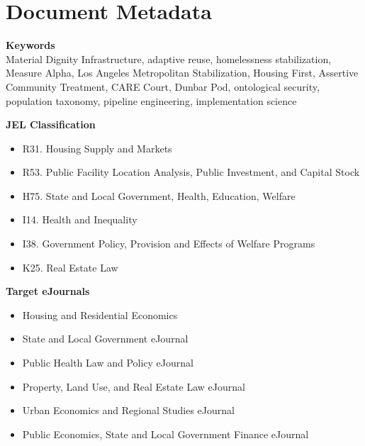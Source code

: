 \documentclass[12pt, letterpaper]{article}
\begin{document}

\newpage
\section*{Document Metadata}

{\footnotesize{}

\noindent\textbf{Keywords}\\[1pt]
Material Dignity Infrastructure, adaptive reuse, homelessness stabilization, Measure Alpha, Los Angeles Metropolitan Stabilization, Housing First, Assertive Community Treatment, CARE Court, Dunbar Pod, ontological security, population taxonomy, pipeline engineering, implementation science

\vspace{8pt}
\noindent\textbf{JEL Classification}
\begin{itemize}[nosep, before={\vspace{-8pt}}, leftmargin=2em]
    \item R31. Housing Supply and Markets
    \item R53. Public Facility Location Analysis, Public Investment, and Capital Stock
    \item H75. State and Local Government, Health, Education, Welfare
    \item I14. Health and Inequality
    \item I38. Government Policy, Provision and Effects of Welfare Programs
    \item K25. Real Estate Law
\end{itemize}

\vspace{8pt}
\noindent\textbf{Target eJournals}
\begin{itemize}[nosep, before={\vspace{-8pt}}, leftmargin=2em]
    \item Housing and Residential Economics
    \item State and Local Government eJournal
    \item Public Health Law and Policy eJournal
    \item Property, Land Use, and Real Estate Law eJournal
    \item Urban Economics and Regional Studies eJournal
    \item Public Economics, State and Local Government Finance eJournal
\end{itemize}

}
\end{document}
